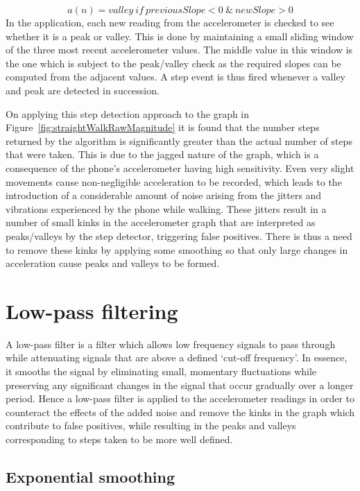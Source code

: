 \documentclass[12pt,a4paper,notitlepage]{report}
\begin{document}
\begin{equation}\label{eq:valleyDetection}
a(n) = valley\ if\ previousSlope < 0\ \&\ newSlope > 0
\end{equation}
In the application, each new reading from the accelerometer is checked to see whether it is a peak or valley. This is done by maintaining a small sliding window of the three most recent accelerometer values. The middle value in this window is the one which is subject to the peak/valley check as the required slopes can be computed from the adjacent values. A step event is thus fired whenever a valley and peak are detected in succession.  

On applying this step detection approach to the graph in Figure~\ref{fig:straightWalkRawMagnitude} it is found that the number steps returned by the algorithm is significantly greater than the actual number of steps that were taken. This is due to the jagged nature of the graph, which is a consequence of the phone's accelerometer having high sensitivity. Even very slight movements cause non-negligible acceleration to be recorded, which leads to the introduction of a considerable amount of noise arising from the jitters and vibrations experienced by the phone while walking. These jitters result in a number of small kinks in the accelerometer graph that are interpreted as peaks/valleys by the step detector, triggering false positives. There is thus a need to remove these kinks by applying some smoothing so that only large changes in acceleration cause peaks and valleys to be formed.  

\section*{Low-pass filtering}

A low-pass filter is a filter which allows low frequency signals to pass through while attenuating signals that are above a defined `cut-off frequency'. In essence, it smooths the signal by eliminating small, momentary fluctuations while preserving any significant changes in the signal that occur gradually over a longer period. Hence a low-pass filter is applied to the accelerometer readings in order to counteract the effects of the added noise and remove the kinks in the graph which contribute to false positives, while resulting in the peaks and valleys corresponding to steps taken to be more well defined. 

\subsection*{Exponential smoothing}
\end{document}
